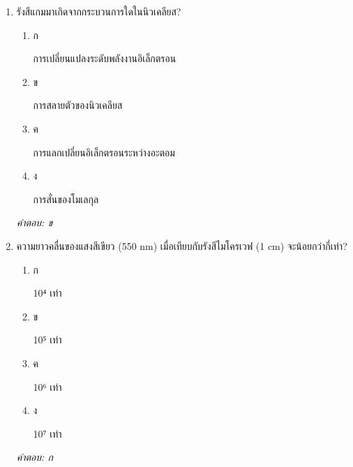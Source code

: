 \documentclass[12pt]{article}
\begin{document}
\begin{enumerate}[label=\arabic*., itemsep=0.5\baselineskip, topsep=0.5\baselineskip, leftmargin=*]
\item รังสีแกมมาเกิดจากกระบวนการใดในนิวเคลียส?
\begin{enumerate}[label=\alph*)., itemsep=0.3\baselineskip, topsep=0.3\baselineskip]
\item ก\ 
\begin{minipage}[t]{0.9\linewidth}
\raggedright การเปลี่ยนแปลงระดับพลังงานอิเล็กตรอน
\end{minipage}
\item ข\ 
\begin{minipage}[t]{0.9\linewidth}
\raggedright การสลายตัวของนิวเคลียส
\end{minipage}
\item ค\ 
\begin{minipage}[t]{0.9\linewidth}
\raggedright การแลกเปลี่ยนอิเล็กตรอนระหว่างอะตอม
\end{minipage}
\item ง\ 
\begin{minipage}[t]{0.9\linewidth}
\raggedright การสั่นของโมเลกุล
\end{minipage}
\end{enumerate}
\vspace{-0.3\baselineskip}
\begin{small}
\textit{คำตอบ: ข}
\end{small}

\item ความยาวคลื่นของแสงสีเขียว (550 nm) เมื่อเทียบกับรังสีไมโครเวฟ (1 cm) จะน้อยกว่ากี่เท่า?
\begin{enumerate}[label=\alph*)., itemsep=0.3\baselineskip, topsep=0.3\baselineskip]
\item ก\ 
\begin{minipage}[t]{0.9\linewidth}
\raggedright 10⁴ เท่า
\end{minipage}
\item ข\ 
\begin{minipage}[t]{0.9\linewidth}
\raggedright 10⁵ เท่า
\end{minipage}
\item ค\ 
\begin{minipage}[t]{0.9\linewidth}
\raggedright 10⁶ เท่า
\end{minipage}
\item ง\ 
\begin{minipage}[t]{0.9\linewidth}
\raggedright 10⁷ เท่า
\end{minipage}
\end{enumerate}
\vspace{-0.3\baselineskip}
\begin{small}
\textit{คำตอบ: ก}
\end{small}


\end{enumerate}
\end{document}
